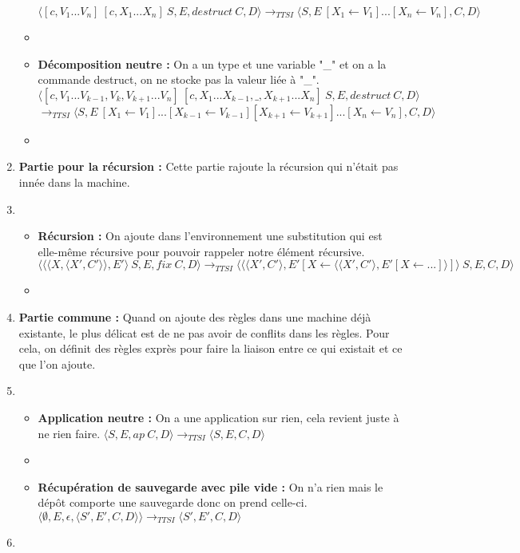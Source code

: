 \documentclass[10pt,a4paper]{report}
\begin{document}
\begin{enumerate}
\begin{itemize}
			\smallbreak
			$\langle [c,V_{1}...V_{n}]~[c,X_{1}...X_{n}]~S,E,destruct~C,D\rangle
			\longrightarrow_{TTSI} \langle S,E~[X_{1} \leftarrow V_{1}]...[X_{n} \leftarrow V_{n}],C,D\rangle$ 
			\item[]
			\item[] \textbf{Décomposition neutre :} On a un type et une variable "\_" et on a la commande destruct, on ne stocke pas la valeur liée à "\_".
			\smallbreak
			$\langle [c,V_{1}...V_{k-1},V_{k},V_{k+1}...V_{n}]~[c,X_{1}...X_{k-1},\_,X_{k+1}...X_{n}]~S,E,destruct~C,D\rangle$
			\smallbreak
			$\longrightarrow_{TTSI} \langle S,E~[X_{1} \leftarrow V_{1}]...[X_{k-1} \leftarrow V_{k-1}][X_{k+1} \leftarrow V_{k+1}]...[X_{n} \leftarrow V_{n}],C,D\rangle$
			\item[]
		\end{itemize}
		\item[] \textbf{Partie pour la récursion :} Cette partie rajoute la récursion qui n'était pas innée dans la machine.
		\item[]
		\begin{itemize}
			\item[] \textbf{Récursion :} On ajoute dans l'environnement une substitution qui est elle-même récursive pour pouvoir rappeler notre élément récursive.
			\smallbreak
			$\langle \langle\langle X,\langle X',C'\rangle\rangle,E'\rangle~S,E,fix~C,D\rangle
			\longrightarrow_{TTSI} \langle \langle\langle X',C'\rangle,E' [X \leftarrow \langle\langle X',C'\rangle,E'[X \leftarrow ...]\rangle]\rangle~S,E,C,D\rangle$ 
			\item[]
		\end{itemize}
		\item[] \textbf{Partie commune :} Quand on ajoute des règles dans une machine déjà existante, le plus délicat est de ne pas avoir de conflits dans les règles. Pour cela, on définit des règles exprès pour faire la liaison entre ce qui existait et ce que l'on ajoute. 
		\item[]
		\begin{itemize}
			\item[] \textbf{Application neutre :} On a une application sur rien, cela revient juste à ne rien faire.
			\smallbreak 
			$\langle S,E,ap~C,D\rangle
			\longrightarrow_{TTSI} 
			\langle S,E,C,D\rangle$
			\item[]
			\item[] \textbf{Récupération de sauvegarde avec pile vide :}  On n'a rien mais le dépôt comporte une sauvegarde donc on prend celle-ci.
			\smallbreak  
			$\langle \emptyset,E,\epsilon,\langle S',E',C,D\rangle\rangle
			\longrightarrow_{TTSI} 
			\langle S',E',C,D\rangle$
		\end{itemize}
		
		\item[]
	\end{enumerate}
	\bigbreak
	\bigbreak
	
\end{document}
